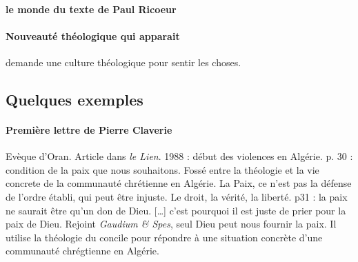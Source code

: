 \paragraph{le monde du texte de Paul Ricoeur}

\paragraph{Nouveauté théologique qui apparait} demande une culture théologique pour sentir les choses. 


\subsection{Quelques exemples}

\paragraph{Première lettre de Pierre Claverie} Evèque d'Oran. Article dans \textit{le Lien}. 1988 : début des violences en Algérie. p. 30 : condition de la paix que nous souhaitons. Fossé entre la théologie et la vie concrete de la communauté chrétienne en Algérie. La Paix, ce n'est pas la défense de l'ordre établi, qui peut être injuste. Le droit, la vérité, la liberté. 
p31 : la paix ne saurait être qu'un don de Dieu.  [\ldots] c'est pourquoi il est juste de prier pour la paix de Dieu.
Rejoint \textit{Gaudium \& Spes}, seul Dieu peut nous fournir la paix. Il utilise la théologie du concile pour répondre à une situation concrète d'une communauté chrégtienne en Algérie.

